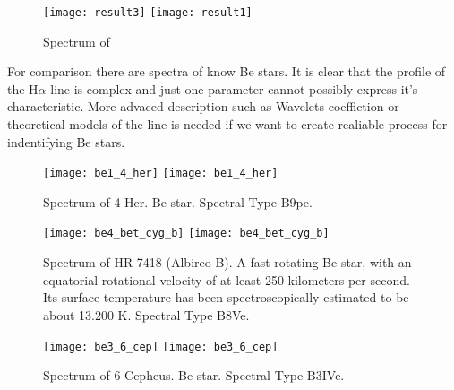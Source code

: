    \begin{figure}[!htbp]
      \begin{center}
        \leavevmode
        \ifpdf
        \texttt{[image: result3]}
        \else
        \texttt{[image: result1]}
        \fi
        \caption{Spectrum of }
        \label{FigResult3}
      \end{center}
    \end{figure}

 
    For comparison there are spectra of know Be stars. It is clear
    that the profile of the H$\alpha$ line is complex and just one
    parameter cannot possibly express it's characteristic. More
    advaced description such as Wavelets coeffiction or theoretical
    models of the line is needed if we want to create realiable
    process for indentifying Be stars.

   \begin{figure}[!htbp]
      \begin{center}
        \leavevmode
        \ifpdf
        \texttt{[image: be1\_4\_her]}
        \else
        \texttt{[image: be1\_4\_her]}
        \fi
        \caption{Spectrum of 4 Her. Be star. Spectral Type B9pe.  }
        \label{FigBe1}
      \end{center}
    \end{figure}

   \begin{figure}[!htbp]
      \begin{center}
        \leavevmode
        \ifpdf
        \texttt{[image: be4\_bet\_cyg\_b]}
        \else
        \texttt{[image: be4\_bet\_cyg\_b]}
        \fi
        \caption{Spectrum of HR 7418 (Albireo B). A fast-rotating Be
          star, with an equatorial rotational velocity of at least 250
          kilometers per second. Its surface temperature has been
          spectroscopically estimated to be about 13.200 K. Spectral
          Type B8Ve. }
        \label{FigBe4}
      \end{center}
    \end{figure}

   \begin{figure}[!htbp]
      \begin{center}
        \leavevmode
        \ifpdf
        \texttt{[image: be3\_6\_cep]}
        \else
        \texttt{[image: be3\_6\_cep]}
        \fi
        \caption{Spectrum of 6 Cepheus. Be star. Spectral Type B3IVe.}
        \label{FigBe3}
      \end{center}
    \end{figure}



